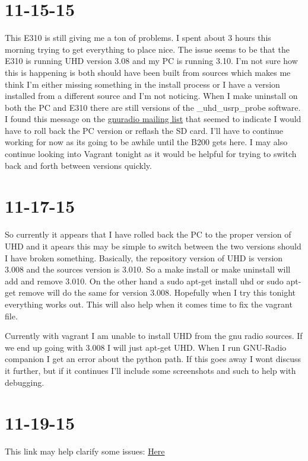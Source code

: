 \documentclass{article}
\begin{document}
	\section{11-15-15}
	This E310 is still giving me a ton of problems. I spent about 3 hours this
	morning trying to get everything to place nice. The issue seems to be that
	the E310 is running UHD version  3.08 and my PC is running 3.10. I'm not
	sure how this is happening is both should have been built from sources
	which makes me think I'm either missing something in the install process
	or I have a version installed from a different source and I'm not noticing.
	When I make uninstall on both the PC and E310 there are still versions
	of the \_uhd\_usrp\_probe software. I found this message on the
	\href{http://lists.ettus.com/pipermail/usrp-users_lists.ettus.com/2015-April/013716.html}{gnuradio mailing list} that seemed to indicate I would have to roll
	back the PC version or reflash the SD card. I'll have to continue working
	for now as its going to be awhile until the B200 gets here. I may
	also continue looking into Vagrant tonight as it would be helpful
	for trying to switch back and forth between versions quickly. 


	\section{11-17-15}
	So currently it appears that I have rolled back the PC to the proper
	version of UHD and it apears this may be simple to switch between the two
	versions should I have broken something. Basically, the repository version
	of UHD is version 3.008 and the sources version is 3.010. So a 
	make install or make uninstall will add and remove 3.010. On the other
	hand a sudo apt-get install uhd or sudo apt-get remove will do the 
	same for version 3.008. Hopefully when I try this tonight everything works
	out. This will also help when it comes time to fix the vagrant file.
	
	Currently with vagrant I am unable to install UHD from the gnu radio
	sources. If we end up going with 3.008 I will just apt-get UHD. When I 
	run GNU-Radio companion I get an error about the python path. If this
	goes away I wont discuss it further, but if it continues I'll include
	some screenshots and such to help with debugging. 

	\section{11-19-15}
	This link may help clarify some issues: 
	\href{https://lists.gnu.org/archive/html/discuss-gnuradio/2015-08/msg00459.html}{Here}
\end{document}
